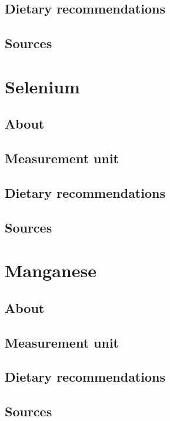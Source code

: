 \documentclass{book}
\begin{document}
\section{Dietary recommendations}


\section{Sources}


\chapter{Selenium}
\section{About}


\section{Measurement unit}


\section{Dietary recommendations}


\section{Sources}


\chapter{Manganese}
\section{About}


\section{Measurement unit}


\section{Dietary recommendations}


\section{Sources}
\end{document}

